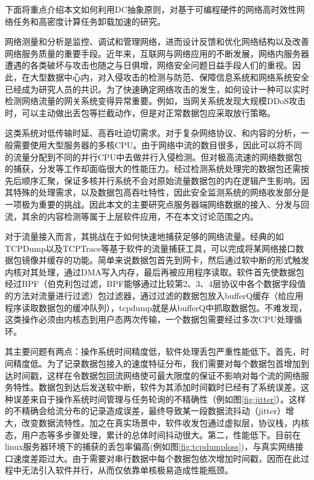 下面将重点介绍本文如何利用DC抽象原则，对基于可编程硬件的网络高时效性网络任务和高密度计算任务卸载加速的研究。




网络测量和分析是监控、调试和管理网络，进而设计反馈和优化网络结构以及改善网络服务质量的重要手段。近年来，互联网与网络应用的不断发展，网络内服务器遭遇的各类破坏与攻击也随之与日俱增，网络安全问题日益手段人们的重视。因此，在大型数据中心内，对入侵攻击的检测与防范、保障信息系统和网络系统安全已经成为研究人员的共识。为了快速确定网络攻击的发生，如何设计一种可以实时检测网络流量的网关系统变得异常重要。例如，当网关系统发现大规模DDoS攻击时，可以主动做出丢包等拦截动作，但是对正常数据包应采取放行策略。

这类系统对低传输时延、高吞吐迫切需求。对于复杂网络协议、和内容的分析，一般需要使用大型服务器的多核CPU。由于网络中流的数目很多，因此可以将不同的流量分配到不同的并行CPU中去做并行入侵检测。但对极高流速的网络数据包的捕获，分发等工作却面临很大的性能压力。经过检测系统处理完的数据包还需按先后顺序汇聚，保证多核并行系统不会对原始流量数据包的内在逻辑产生影响。因其特殊的处理需求，以及数据包高吞吐特性，因此安全监测系统的网络收发部分是一项极为重要的挑战。因此本文的主要研究点服务器端网络数据的接入、分发与回流，其余的内容检测等属于上层软件应用，不在本文讨论范围之内。






对于流量接入而言，其挑战在于如何快速地捕获足够的网络流量。经典的如TCPDump以及TCPTrace等基于软件的流量捕获工具，可以完成将某网络接口数据包镜像并缓存的功能。简单来说数据包首先到网卡，然后通过软中断的形式触发内核对其处理，通过DMA写入内存，最后再被应用程序读取。软件首先使数据包经过BPF（伯克利包过滤，BPF能够通过比较第2、3、4层协议中各个数据字段值的方法对流量进行过滤）包过滤器，通过过滤的数据包放入bufferQ缓存（给应用程序读取数据包的缓冲队列），tcpdump就是从bufferQ中抓取数据包。不难发现，这类操作必须由内核态到用户态两次传输，一个数据包需要经过多次CPU处理循环。

其主要问题有两点：操作系统时间精度低，软件处理丢包严重性能低下。首先，时间精度低。为了记录数据包接入的速度特征分布，我们需要对每个数据包首增加到达时间戳，这样在令数据包回流网络使可最大限度的保证不影响对每个流的网络服务特性。数据包到达后发送软中断，软件为其添加时间戳时已经有了系统误差。这种误差来自于操作系统时间管理与任务轮询的不精确性（例如图\ref{fig:jitter}）。这样的不精确会给流分布的记录造成误差，最终导致某一段数据流抖动（jitter）增大，改变数据流特性。加之在真实场景中，软件收发包通过虚拟层，协议栈，内核态，用户态等多步骤处理，累计的总体时间抖动很大。第二，性能低下。目前在linux服务器环境下的捕获的丢包率偏高(例如图\ref{fig:tcpdumploss})，与真实网络接口速度差距过大。由于需要对串行数据中每个数据包依次增加时间戳，因而在此过程中无法引入软件并行，从而仅依靠单核极易造成性能瓶颈。



